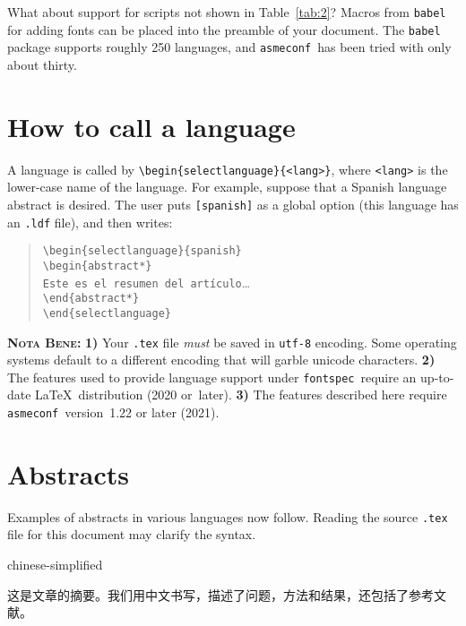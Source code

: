 \documentclass[colorlinks,nofoot,fontspec,spanish,japanese,russian,greek,ukrainian,vietnamese,french,portuguese,turkish,polish,indonesian,italian,german,latin,serbianc,bidi=basic]{asmeconf}
\newcommand*\FS{{\upshape\texttt{fontspec}}}
\newcommand*\AC{{\upshape\texttt{asmeconf}}}
\begin{document}
What about support for scripts not shown in Table~\ref{tab:2}?  Macros from \texttt{babel} for adding fonts can be placed into the preamble of your document.  The \texttt{babel} package supports roughly 250 languages, and \AC\ has been tried with only about thirty. 

\section{How to call a language\label{sec:6}}
A language is called by \verb|\begin{selectlanguage}{<lang>}|, where \texttt{<lang>} is the lower-case name of the language.  
For example, suppose that a Spanish language abstract is desired. The user puts \texttt{[spanish]} as a global option (this language has an \texttt{.ldf} file), and then writes:
\begin{quotation}
\noindent\hbox{}\verb|\begin{selectlanguage}{spanish}|\\
\verb|\begin{abstract*}|\\
\verb|Este es el resumen del artículo|\ldots\\ 
\verb|\end{abstract*}|\\
\verb|\end{selectlanguage}|
\end{quotation}

\textsc{\textbf{Nota Bene:}} \textbf{1)} Your \texttt{.tex} file \textit{must} be saved in \texttt{utf-8} encoding.  Some operating systems default to a different encoding that will garble unicode characters. \textbf{2)} The features used to provide language support under \FS\ require an up-to-date \LaTeX\ distribution (2020 or~later). \textbf{3)} The features described here require \AC\  version~1.22 or later (2021).

\section{Abstracts}
Examples of abstracts in various languages now follow. Reading the source \texttt{.tex} file for this document may clarify the syntax.

\begin{selectlanguage}{chinese-simplified}
\begin{abstract*}
这是文章的摘要。我们用中文书写，描述了问题，方法和结果，还包括了参考文献。
\end{abstract*}
\end{selectlanguage}%
\end{document}
